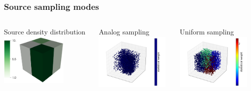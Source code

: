 \documentclass[xcolor=x11names,compress]{beamer}
\begin{document}
\begin{frame}
\frametitle{Source sampling modes}

\begin{columns}[T]
\begin{column}{0.3\textwidth}
\begin{block}{\tiny Source density distribution}
\vspace{0.2cm}
\includegraphics[height=2.5cm]{sampler_src.png}
\end{block}
\end{column}
\begin{column}{0.3\textwidth}
\begin{block}{\tiny Analog sampling}
\includegraphics[height=2.7cm]{sample_cart.png}
\end{block}
\end{column}
\begin{column}{0.3\textwidth}
\begin{block}{\tiny Uniform sampling}
\includegraphics[height=2.7cm]{sample_uniform.png}
\end{block}
\end{column}
\end{columns}


\end{frame}
\end{document}
